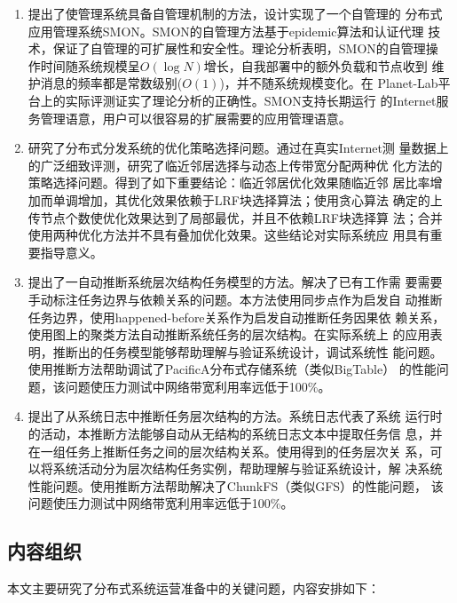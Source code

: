 \begin{enumerate}

    \item 提出了使管理系统具备自管理机制的方法，设计实现了一个自管理的
    分布式应用管理系统SMON。SMON的自管理方法基于epidemic算法和认证代理
    技术，保证了自管理的可扩展性和安全性。理论分析表明，SMON的自管理操
    作时间随系统规模呈$O(\log N)$增长，自我部署中的额外负载和节点收到
    维护消息的频率都是常数级别($O(1)$)，并不随系统规模变化。在
    Planet-Lab平台上的实际评测证实了理论分析的正确性。SMON支持长期运行
    的Internet服务管理语意，用户可以很容易的扩展需要的应用管理语意。

    \item 研究了分布式分发系统的优化策略选择问题。通过在真实Internet测
    量数据上的广泛细致评测，研究了临近邻居选择与动态上传带宽分配两种优
    化方法的策略选择问题。得到了如下重要结论：临近邻居优化效果随临近邻
    居比率增加而单调增加，其优化效果依赖于LRF块选择算法；使用贪心算法
    确定的上传节点个数使优化效果达到了局部最优，并且不依赖LRF块选择算
    法；合并使用两种优化方法并不具有叠加优化效果。这些结论对实际系统应
    用具有重要指导意义。

    \item 提出了一自动推断系统层次结构任务模型的方法。解决了已有工作需
    要需要手动标注任务边界与依赖关系的问题。本方法使用同步点作为启发自
    动推断任务边界，使用happened-before关系作为启发自动推断任务因果依
    赖关系，使用图上的聚类方法自动推断系统任务的层次结构。在实际系统上
    的应用表明，推断出的任务模型能够帮助理解与验证系统设计，调试系统性
    能问题。使用推断方法帮助调试了PacificA分布式存储系统（类似BigTable）
    的性能问题，该问题使压力测试中网络带宽利用率远低于100\%。

    \item 提出了从系统日志中推断任务层次结构的方法。系统日志代表了系统
    运行时的活动，本推断方法能够自动从无结构的系统日志文本中提取任务信
    息，并在一组任务上推断任务之间的层次结构关系。使用得到的任务层次关
    系，可以将系统活动分为层次结构任务实例，帮助理解与验证系统设计，解
    决系统性能问题。使用推断方法帮助解决了ChunkFS（类似GFS）的性能问题，
    该问题使压力测试中网络带宽利用率远低于100\%。

\end{enumerate}

\subsection{内容组织}

本文主要研究了分布式系统运营准备中的关键问题，内容安排如下：

